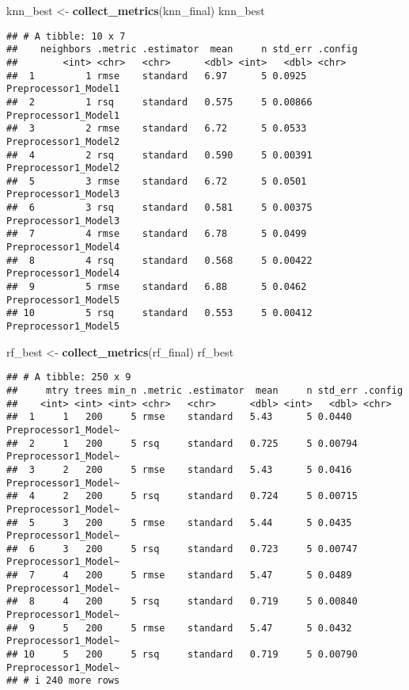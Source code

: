 \documentclass[
]{article}
\newenvironment{Shaded}{\begin{snugshade}}{\end{snugshade}}
\newcommand{\FunctionTok}[1]{\textcolor[rgb]{0.13,0.29,0.53}{\textbf{#1}}}
\newcommand{\NormalTok}[1]{#1}
\newcommand{\OtherTok}[1]{\textcolor[rgb]{0.56,0.35,0.01}{#1}}
\begin{document}
\begin{Shaded}
\begin{Highlighting}[]
\NormalTok{knn\_best }\OtherTok{\textless{}{-}} \FunctionTok{collect\_metrics}\NormalTok{(knn\_final)}
\NormalTok{knn\_best}
\end{Highlighting}
\end{Shaded}

\begin{verbatim}
## # A tibble: 10 x 7
##    neighbors .metric .estimator  mean     n std_err .config             
##        <int> <chr>   <chr>      <dbl> <int>   <dbl> <chr>               
##  1         1 rmse    standard   6.97      5 0.0925  Preprocessor1_Model1
##  2         1 rsq     standard   0.575     5 0.00866 Preprocessor1_Model1
##  3         2 rmse    standard   6.72      5 0.0533  Preprocessor1_Model2
##  4         2 rsq     standard   0.590     5 0.00391 Preprocessor1_Model2
##  5         3 rmse    standard   6.72      5 0.0501  Preprocessor1_Model3
##  6         3 rsq     standard   0.581     5 0.00375 Preprocessor1_Model3
##  7         4 rmse    standard   6.78      5 0.0499  Preprocessor1_Model4
##  8         4 rsq     standard   0.568     5 0.00422 Preprocessor1_Model4
##  9         5 rmse    standard   6.88      5 0.0462  Preprocessor1_Model5
## 10         5 rsq     standard   0.553     5 0.00412 Preprocessor1_Model5
\end{verbatim}

\begin{Shaded}
\begin{Highlighting}[]
\NormalTok{rf\_best }\OtherTok{\textless{}{-}} \FunctionTok{collect\_metrics}\NormalTok{(rf\_final)}
\NormalTok{rf\_best}
\end{Highlighting}
\end{Shaded}

\begin{verbatim}
## # A tibble: 250 x 9
##     mtry trees min_n .metric .estimator  mean     n std_err .config             
##    <int> <int> <int> <chr>   <chr>      <dbl> <int>   <dbl> <chr>               
##  1     1   200     5 rmse    standard   5.43      5 0.0440  Preprocessor1_Model~
##  2     1   200     5 rsq     standard   0.725     5 0.00794 Preprocessor1_Model~
##  3     2   200     5 rmse    standard   5.43      5 0.0416  Preprocessor1_Model~
##  4     2   200     5 rsq     standard   0.724     5 0.00715 Preprocessor1_Model~
##  5     3   200     5 rmse    standard   5.44      5 0.0435  Preprocessor1_Model~
##  6     3   200     5 rsq     standard   0.723     5 0.00747 Preprocessor1_Model~
##  7     4   200     5 rmse    standard   5.47      5 0.0489  Preprocessor1_Model~
##  8     4   200     5 rsq     standard   0.719     5 0.00840 Preprocessor1_Model~
##  9     5   200     5 rmse    standard   5.47      5 0.0432  Preprocessor1_Model~
## 10     5   200     5 rsq     standard   0.719     5 0.00790 Preprocessor1_Model~
## # i 240 more rows
\end{verbatim}
\end{document}
